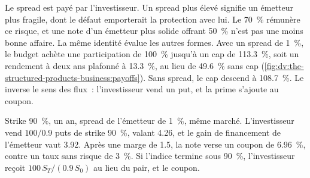 \begin{omfigure}

\label{fig:dv:the-structured-products-business:participation}
\end{omfigure}

Le spread est payé par l'investisseur. Un spread plus élevé signifie un émetteur plus fragile, dont le défaut emporterait la protection avec lui. Le
70~\% rémunère ce risque, et une note d'un émetteur plus solide offrant 50~\% n'est pas une moins bonne affaire. La même identité
évalue les autres formes. Avec un spread de 1~\%, le budget achète une participation de 100~\% jusqu'à un cap de 113.3~\%, soit un rendement à deux ans plafonné à 13.3~\%,
au lieu de 49.6~\% sans cap (\cref{fig:dv:the-structured-products-business:payoffs}). Sans spread, le cap descend à 108.7~\%. Le
 inverse le sens des flux~: l'investisseur vend un put, et la prime s'ajoute au coupon.

\begin{example}\label{ex:dv:the-structured-products-business:rc}
Strike 90~\%, un an, spread de l'émetteur de 1~\%, même marché. L'investisseur vend $100/0.9$ puts de strike 90~\%, valant 4.26, et le
gain de financement de l'émetteur vaut 3.92. Après une marge de 1.5, la note verse un coupon de 6.96~\%, contre un taux sans risque de 3~\%. Si
l'indice termine sous 90~\%, l'investisseur reçoit $100\,S_T/(0.9\,S_0)$ au lieu du pair, et le coupon.
\end{example}

